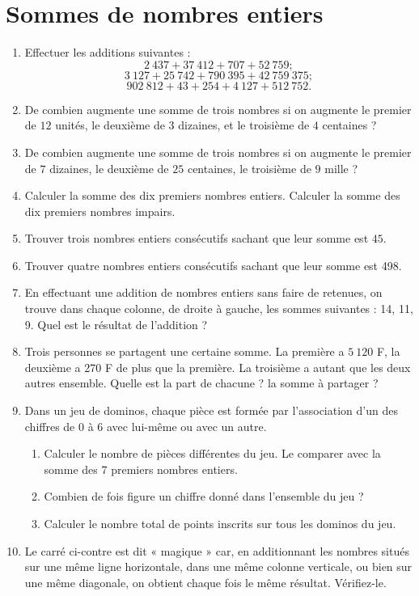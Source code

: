 \chapter{Sommes de nombres entiers}
 \begin{enumerate}
\item Effectuer les additions suivantes : 
\[ 2\ 437 + 37\ 412 + 707 + 52\ 759 ;\]
\[ 3~127+ 25~742+790~395 + 42~759~375 ;\]
\[ 902~812+ 43 + 254 + 4~127 + 512~752.\]
\item De combien augmente une somme de trois nombres si on augmente le premier de $12$ unités, le deuxième de $3$ dizaines, et le troisième de $4$ centaines ?
\item De combien augmente une somme de trois nombres si on augmente le premier de $7$ dizaines, le deuxième de $25$ centaines, le troisième de $9$ mille ?
\item Calculer la somme des dix premiers nombres entiers. 
Calculer la somme des dix premiers nombres impairs.
\item Trouver trois nombres entiers consécutifs sachant que leur somme est $45$. 
\item Trouver quatre nombres entiers consécutifs sachant que leur somme est 498. 
\item En effectuant une addition de nombres entiers sans faire de retenues, on 
trouve dans chaque colonne, de droite à gauche, les sommes suivantes : 14, 11, 9. Quel est le résultat de l'addition ? 
\item Trois personnes se partagent une certaine somme. La première a $5~120$ F, la deuxième a 270 F de plus que la première. La troisième a autant que les deux autres ensemble. Quelle est la part de chacune ? la somme à partager ?
\item Dans un jeu de dominos, chaque pièce est formée par l'association d'un des chiffres de $0$ à $6$ avec lui-même ou avec un autre. \begin{enumerate}
\item Calculer le nombre de pièces différentes du jeu. Le comparer avec la somme des 7 premiers nombres entiers.
\item Combien de fois figure un chiffre donné dans l'ensemble du jeu ? 
\item Calculer le nombre total de points inscrits sur tous les dominos du jeu.
\end{enumerate}
\item \begin{enumerate}
Le carré ci-contre est dit « magique » car, en additionnant les nombres situés sur une même ligne horizontale, dans une même colonne verticale, ou bien sur une même diagonale, on obtient chaque fois le même résultat. Vérifiez-le. 

\end{enumerate}
\end{enumerate}
